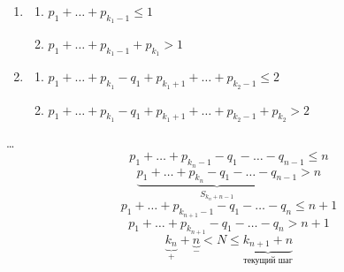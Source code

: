 \documentclass[book, 11pt]{report}
\begin{document}
        \par{
        \begin{enumerate}
            \item \par{
            \begin{enumerate}
                \item \par{$p_1+\ldots+p_{k_1-1}\leq1$}
                \item \par{$p_1+\ldots+p_{k_1-1}+p_{k_1}>1$}
            \end{enumerate}}
            \item \par{
            \begin{enumerate}
                \item \par{$p_1+\ldots+p_{k_1}-q_1+p_{k_1+1}+\ldots+p_{k_2-1}\leq2$}
                \item \par{$p_1+\ldots+p_{k_1}-q_1+p_{k_1+1}+\ldots+p_{k_2-1}+p_{k_2}>2$}
            \end{enumerate}
            }
        \end{enumerate}
        } 
        \ldots \\
        \begin{equation*}
            p_1+\ldots+p_{k_n-1}-q_1-\ldots-q_{n-1} \leq n
        \end{equation*}
        \begin{equation}
            \underbrace{p_1+\ldots+p_{k_n}-q_1-\ldots-q_{n-1}}_{S_{{k_n}+n-1}} > n
        \end{equation}
        \begin{equation*}
            p_1+\ldots+p_{k_{n+1}-1}-q_1-\ldots-q_{n} \leq n+1
        \end{equation*}
        \begin{equation*}
            p_1+\ldots+p_{k_{n+1}}-q_1-\ldots-q_{n} > n+1
        \end{equation*}
        \begin{equation}
            \underbrace{k_n}_{+}+\underbrace{n}_{-}<N\leq \underbrace{k_{n+1}+n}_{\text{текущий шаг}}
        \end{equation}
\end{document}
